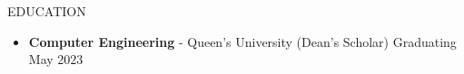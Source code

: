 \documentclass{resume} %
\begin{document}
\begin{rSection}{EDUCATION}
    \begin{itemize}
        \item {\bf Computer Engineering} - Queen's University (Dean's Scholar) \hfill {Graduating May 2023}
    \end{itemize}
\end{rSection}
\end{document}
